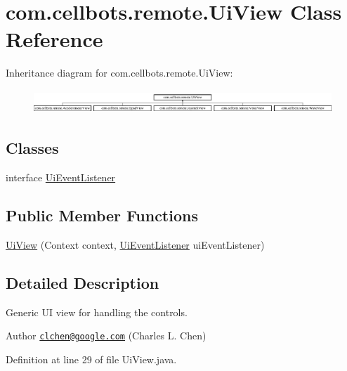 \hypertarget{classcom_1_1cellbots_1_1remote_1_1_ui_view}{\section{com.\-cellbots.\-remote.\-Ui\-View Class Reference}
\label{classcom_1_1cellbots_1_1remote_1_1_ui_view}
}
Inheritance diagram for com.\-cellbots.\-remote.\-Ui\-View\-:\begin{figure}[H]
\begin{center}
\leavevmode
\includegraphics[height=0.906883cm]{classcom_1_1cellbots_1_1remote_1_1_ui_view}
\end{center}
\end{figure}
\subsection*{Classes}
\begin{DoxyCompactItemize}
\item 
interface \hyperlink{interfacecom_1_1cellbots_1_1remote_1_1_ui_view_1_1_ui_event_listener}{Ui\-Event\-Listener}
\end{DoxyCompactItemize}
\subsection*{Public Member Functions}
\begin{DoxyCompactItemize}
\item 
\hyperlink{classcom_1_1cellbots_1_1remote_1_1_ui_view_a652044ad533d14d50400134e35b0b080}{Ui\-View} (Context context, \hyperlink{interfacecom_1_1cellbots_1_1remote_1_1_ui_view_1_1_ui_event_listener}{Ui\-Event\-Listener} ui\-Event\-Listener)
\end{DoxyCompactItemize}


\subsection{Detailed Description}
Generic U\-I view for handling the controls.

\begin{DoxyAuthor}{Author}
\href{mailto:clchen@google.com}{\tt clchen@google.\-com} (Charles L. Chen) 
\end{DoxyAuthor}


Definition at line 29 of file Ui\-View.\-java.




